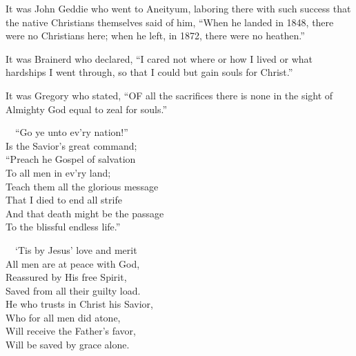 \documentclass[
]{book}
\begin{document}
It was John Geddie who went to Aneityum, laboring there with such success that the native Christians themselves said of him, ``When he landed in 1848, there were no Christians here; when he left, in 1872, there were no heathen.''

It was Brainerd who declared, ``I cared not where or how I lived or what hardships I went through, so that I could but gain souls for Christ.''

It was Gregory who stated, ``OF all the sacrifices there is none in the sight of Almighty God equal to zeal for souls.''

~~``Go ye unto ev'ry nation!''\\
\hspace*{0.333em}\hspace*{0.333em}Is the Savior's great command;\\
\hspace*{0.333em}\hspace*{0.333em}``Preach he Gospel of salvation\\
\hspace*{0.333em}\hspace*{0.333em}To all men in ev'ry land;\\
\hspace*{0.333em}\hspace*{0.333em}Teach them all the glorious message\\
\hspace*{0.333em}\hspace*{0.333em}That I died to end all strife\\
\hspace*{0.333em}\hspace*{0.333em}And that death might be the passage\\
\hspace*{0.333em}\hspace*{0.333em}To the blissful endless life.''

~~`Tis by Jesus' love and merit\\
\hspace*{0.333em}\hspace*{0.333em}All men are at peace with God,\\
\hspace*{0.333em}\hspace*{0.333em}Reassured by His free Spirit,\\
\hspace*{0.333em}\hspace*{0.333em}Saved from all their guilty load.\\
\hspace*{0.333em}\hspace*{0.333em}He who trusts in Christ his Savior,\\
\hspace*{0.333em}\hspace*{0.333em}Who for all men did atone,\\
\hspace*{0.333em}\hspace*{0.333em}Will receive the Father's favor,\\
\hspace*{0.333em}\hspace*{0.333em}Will be saved by grace alone.
\end{document}
